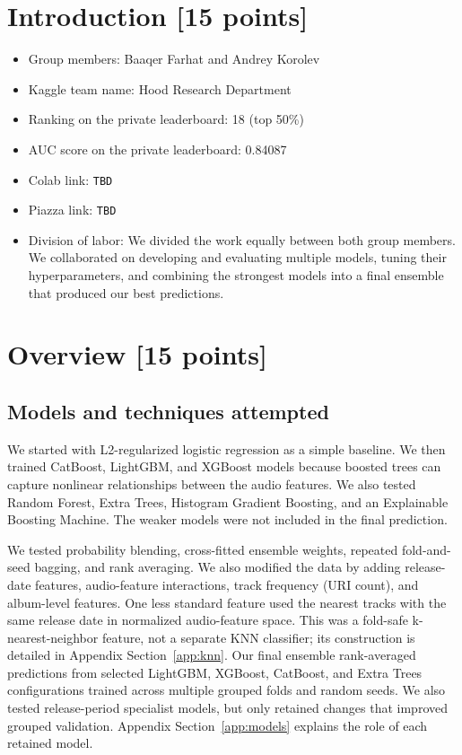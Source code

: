\documentclass{article}
\begin{document}
\pagestyle{fancy}


\newpage

\section{Introduction [15 points]}
\begin{itemize}
  \item Group members: Baaqer Farhat and Andrey Korolev
  \item Kaggle team name: Hood Research Department
  \item Ranking on the private leaderboard: 18 (top 50\%)
  \item AUC score on the private leaderboard: 0.84087
  \item Colab link: \texttt{TBD}
  \item Piazza link: \texttt{TBD}
  \item Division of labor: We divided the work equally between both group
  members. We collaborated on developing and evaluating multiple models,
  tuning their hyperparameters, and combining the strongest models into a
  final ensemble that produced our best predictions.
\end{itemize}
\newpage

\section{Overview [15 points]}
\subsection{Models and techniques attempted}
We started with L2-regularized logistic regression as a simple baseline. We
then trained CatBoost, LightGBM, and XGBoost models because boosted trees can
capture nonlinear relationships between the audio features. We also tested
Random Forest, Extra Trees, Histogram Gradient Boosting, and an Explainable
Boosting Machine. The weaker models were not included in the final prediction.

We tested probability blending, cross-fitted ensemble weights, repeated
fold-and-seed bagging, and rank averaging. We also modified the data by adding
release-date features, audio-feature interactions, track frequency (URI count),
and album-level features. One less standard feature used the nearest tracks
with the same release date in normalized audio-feature space. This was a
fold-safe k-nearest-neighbor feature, not a separate KNN classifier; its
construction is detailed in Appendix Section~\ref{app:knn}. Our final
ensemble rank-averaged predictions from selected LightGBM, XGBoost, CatBoost,
and Extra Trees configurations trained across multiple grouped folds and random seeds. We
also tested release-period specialist models, but only retained changes that
improved grouped validation. Appendix Section~\ref{app:models} explains the
role of each retained model.
\end{document}
